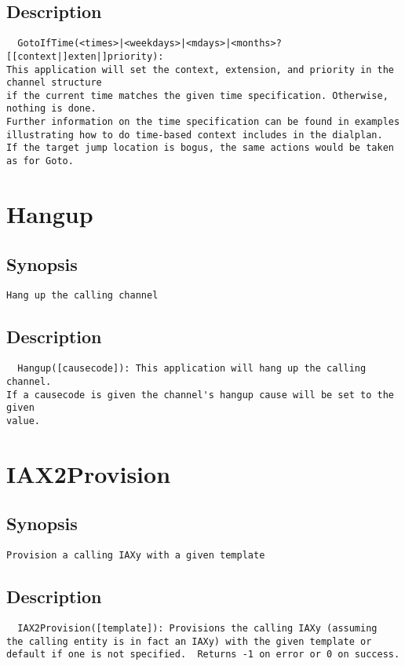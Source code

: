 \subsection{Description}
\begin{verbatim}
  GotoIfTime(<times>|<weekdays>|<mdays>|<months>?[[context|]exten|]priority):
This application will set the context, extension, and priority in the channel structure
if the current time matches the given time specification. Otherwise, nothing is done.
Further information on the time specification can be found in examples
illustrating how to do time-based context includes in the dialplan.
If the target jump location is bogus, the same actions would be taken as for Goto.

\end{verbatim}


\section{Hangup}
\subsection{Synopsis}
\begin{verbatim}
Hang up the calling channel
\end{verbatim}
\subsection{Description}
\begin{verbatim}
  Hangup([causecode]): This application will hang up the calling channel.
If a causecode is given the channel's hangup cause will be set to the given
value.

\end{verbatim}


\section{IAX2Provision}
\subsection{Synopsis}
\begin{verbatim}
Provision a calling IAXy with a given template
\end{verbatim}
\subsection{Description}
\begin{verbatim}
  IAX2Provision([template]): Provisions the calling IAXy (assuming
the calling entity is in fact an IAXy) with the given template or
default if one is not specified.  Returns -1 on error or 0 on success.

\end{verbatim}



